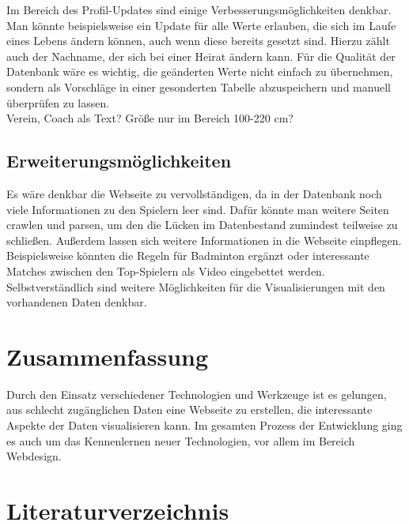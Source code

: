 \documentclass[12pt,a4paper]{scrreprt}
\begin{document}
Im Bereich des Profil-Updates sind einige Verbesserungsmöglichkeiten denkbar. Man könnte beispielsweise ein Update für alle Werte erlauben, die sich im Laufe eines Lebens ändern können, auch wenn diese bereits gesetzt sind. Hierzu zählt auch der Nachname, der sich bei einer Heirat ändern kann. Für die Qualität der Datenbank wäre es wichtig, die geänderten Werte nicht einfach zu übernehmen, sondern als Vorschläge in einer gesonderten Tabelle abzuspeichern und manuell überprüfen zu lassen.\\

Verein, Coach als Text? Größe nur im Bereich 100-220 cm?

\section{Erweiterungsmöglichkeiten}
Es wäre denkbar die Webseite zu \glqq vervollständigen\grqq, da in der Datenbank noch viele Informationen zu den Spielern leer sind. Dafür könnte man weitere Seiten crawlen und parsen, um den die Lücken im Datenbestand zumindest teilweise zu schließen. Außerdem lassen sich weitere Informationen in die Webseite einpflegen. Beispielsweise könnten die Regeln für Badminton ergänzt oder interessante Matches zwischen den Top-Spielern als Video eingebettet werden. Selbstverständlich sind weitere Möglichkeiten für die Visualisierungen mit den vorhandenen Daten denkbar.

\chapter*{Zusammenfassung}
Durch den Einsatz verschiedener Technologien und Werkzeuge ist es gelungen, aus schlecht zugänglichen Daten eine Webseite zu erstellen, die interessante Aspekte der Daten visualisieren kann. Im gesamten Prozess der Entwicklung ging es auch um das Kennenlernen neuer Technologien, vor allem im Bereich Webdesign.

\newpage

\chapter*{Literaturverzeichnis}
\printbibliography	
\newpage

\newpage
\end{document}
